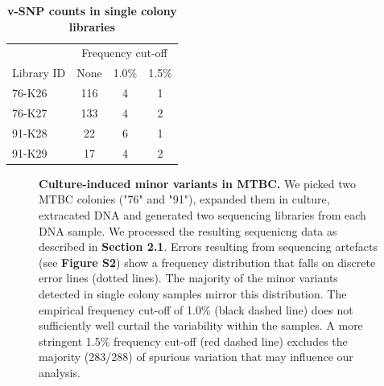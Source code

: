 \documentclass[12pt, oneside]{article}   	%
\begin{document}
\begin{table}[htbp]
   \centering
   \caption*{\textbf{v-SNP counts in single colony libraries}}
   \begin{tabular}{@{} lccc @{}} %
      \toprule
       & \multicolumn{3}{c}{Frequency cut-off}\\
      \cmidrule(lr){2-4}
      Library ID & None & 1.0\% & 1.5\% \\
      \midrule
      76-K26 & 116 & 4 & 1\\
      76-K27 & 133 & 4 & 2\\
      91-K28 & 22 & 6 & 1\\
      91-K29 & 17 & 4 & 2\\
      \bottomrule
   \end{tabular}
   \label{tab:SingCvSNP}
\end{table}

\begin{figure}
\centering
{}
\label{fig:supfig3}
\caption{\textbf{Culture-induced minor variants in MTBC.} We picked two MTBC colonies ("76" and "91"), expanded them in culture, extracated DNA and generated two sequencing libraries from each DNA sample. We processed the resulting sequenicng data as described in \textbf{Section 2.1}. Errors resulting from sequencing artefacts (see \textbf{Figure S2}) show a frequency distribution that falls on discrete error lines (dotted lines). The majority of the minor variants detected in single colony samples mirror this distribution. The empirical frequency cut-off of 1.0\% (black dashed line) does not sufficiently well curtail the variability within the samples. A more stringent 1.5\% frequency cut-off (red dashed line) excludes the majority (283/288) of spurious variation that may influence our analysis.}
\end{figure}
\end{document}
